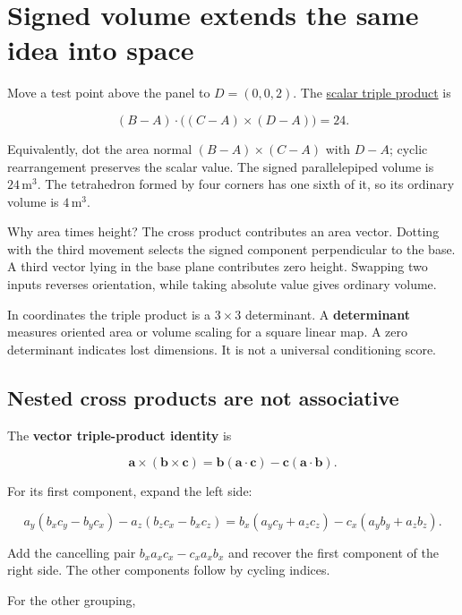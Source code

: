 \section{Signed volume extends the same idea into space}\label{01-foundations-i-ch017-signed-volume-extends-the-same-idea-into-space}

Move a test point above the panel to \(D=(0,0,2)\). The \hyperref[01-foundations-i-ch017-signed-volume-extends-the-same-idea-into-space]{scalar triple product} is

\[
(B-A)\cdot\big((C-A)\times(D-A)\big)=24.
\]

Equivalently, dot the area normal \((B-A)\times(C-A)\) with \(D-A\); cyclic rearrangement preserves the scalar value. The signed parallelepiped volume is \(24\,\mathrm{m}^3\). The tetrahedron formed by four corners has one sixth of it, so its ordinary volume is \(4\,\mathrm{m}^3\).

Why area times height? The cross product contributes an area vector. Dotting with the third movement selects the signed component perpendicular to the base. A third vector lying in the base plane contributes zero height. Swapping two inputs reverses orientation, while taking absolute value gives ordinary volume.

In coordinates the triple product is a \(3\times3\) determinant. A \textbf{determinant} measures oriented area or volume scaling for a square linear map. A zero determinant indicates lost dimensions. It is not a universal conditioning score.

\subsection{Nested cross products are not associative}\label{01-foundations-i-ch017-nested-cross-products-are-not-associative}

The \textbf{vector triple-product identity} is

\[
\mathbf a\times(\mathbf b\times\mathbf c)
=\mathbf b(\mathbf a\cdot\mathbf c)-\mathbf c(\mathbf a\cdot\mathbf b).
\]

For its first component, expand the left side:

\[
a_y(b_xc_y-b_yc_x)-a_z(b_zc_x-b_xc_z)
=b_x(a_yc_y+a_zc_z)-c_x(a_yb_y+a_zb_z).
\]

Add the cancelling pair \(b_xa_xc_x-c_xa_xb_x\) and recover the first component of the right side. The other components follow by cycling indices.

For the other grouping,

